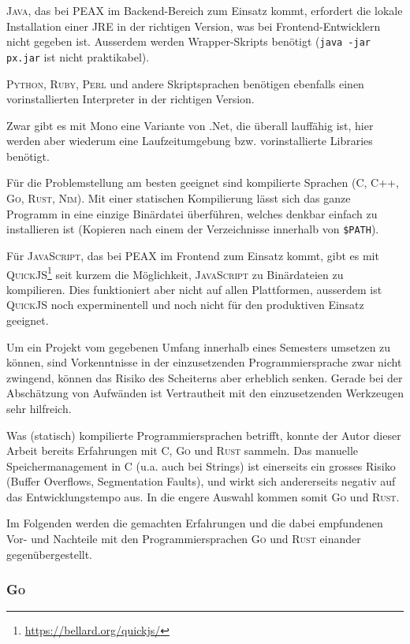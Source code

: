 \textsc{Java}, das bei PEAX im Backend-Bereich zum Einsatz kommt, erfordert die lokale Installation einer JRE in der richtigen Version, was bei Frontend-Entwicklern nicht gegeben ist. Ausserdem werden Wrapper-Skripts benötigt (\texttt{java -jar px.jar} ist nicht praktikabel).

\textsc{Python}, \textsc{Ruby}, \textsc{Perl} und andere Skriptsprachen benötigen ebenfalls einen vorinstallierten Interpreter in der richtigen Version.

Zwar gibt es mit Mono eine Variante von .Net, die überall lauffähig ist, hier werden aber wiederum eine Laufzeitumgebung bzw. vorinstallierte Libraries benötigt.

Für die Problemstellung am besten geeignet sind kompilierte Sprachen (C, C++, \textsc{Go}, \textsc{Rust}, \textsc{Nim}). Mit einer statischen Kompilierung lässt sich das ganze Programm in eine einzige Binärdatei überführen, welches denkbar einfach zu installieren ist (Kopieren nach einem der Verzeichnisse innerhalb von \texttt{\$PATH}).

Für \textsc{JavaScript}, das bei PEAX im Frontend zum Einsatz kommt, gibt es mit \textsc{QuickJS}\footnote{\url{https://bellard.org/quickjs/}} seit kurzem die Möglichkeit, \textsc{JavaScript} zu Binärdateien zu kompilieren. Dies funktioniert aber nicht auf allen Plattformen, ausserdem ist \textsc{QuickJS} noch experminentell und noch nicht für den produktiven Einsatz geeignet.

Um ein Projekt vom gegebenen Umfang innerhalb eines Semesters umsetzen zu können, sind Vorkenntnisse in der einzusetzenden Programmiersprache zwar nicht zwingend, können das Risiko des Scheiterns aber erheblich senken. Gerade bei der Abschätzung von Aufwänden ist Vertrautheit mit den einzusetzenden Werkzeugen sehr hilfreich.

Was (statisch) kompilierte Programmiersprachen betrifft, konnte der Autor dieser Arbeit bereits Erfahrungen mit C, \textsc{Go} und \textsc{Rust} sammeln. Das manuelle Speichermanagement in C (u.a. auch bei Strings) ist einerseits ein grosses Risiko (Buffer Overflows, Segmentation Faults), und wirkt sich andererseits negativ auf das Entwicklungstempo aus. In die engere Auswahl kommen somit \textsc{Go} und \textsc{Rust}.

Im Folgenden werden die gemachten Erfahrungen und die dabei empfundenen Vor- und Nachteile mit den Programmiersprachen \textsc{Go} und \textsc{Rust} einander gegenübergestellt.

\subsubsection{\textsc{Go}}

